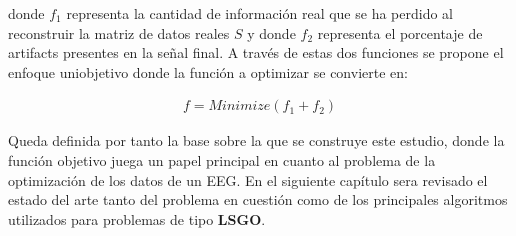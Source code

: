  donde $f_1$ representa la cantidad de información real que se ha perdido al reconstruir la matriz de datos reales $S$ y donde $f_2$ representa el porcentaje de artifacts presentes en la señal final. A través de estas dos funciones se propone el enfoque uniobjetivo donde la función a optimizar se convierte en:
 
 \begin{equation} \label{eq:FObj}
	 \begin{gathered}
	 	f = Minimize(f_1 + f_2)
	 \end{gathered}
 \end{equation}
 
 Queda definida por tanto la base sobre la que se construye este estudio, donde la función objetivo juega un papel principal en cuanto al problema de la optimización de los datos de un EEG. En el siguiente capítulo sera revisado el estado del arte tanto del problema en cuestión como de los principales algoritmos utilizados para problemas de tipo \textbf{LSGO}.